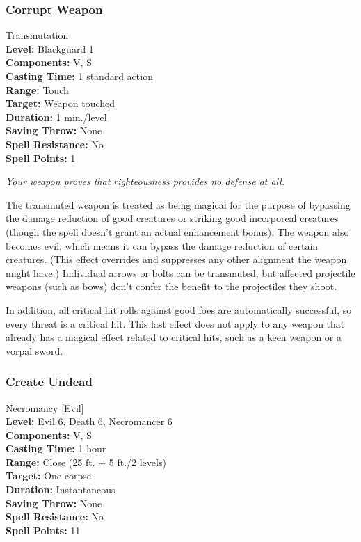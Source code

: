 \subsubsection{Corrupt Weapon}
\label{Spell:CorruptWeapon}
Transmutation
\\ \textbf{Level:} Blackguard 1
\\ \textbf{Components:} V, S
\\ \textbf{Casting Time:} 1 standard action
\\ \textbf{Range:} Touch
\\ \textbf{Target:} Weapon touched
\\ \textbf{Duration:} 1 min./level
\\ \textbf{Saving Throw:} None
\\ \textbf{Spell Resistance:} No
\\ \textbf{Spell Points:} 1

\emph{Your weapon proves that righteousness provides no defense at all.}

The transmuted weapon is treated as being magical for the purpose of bypassing the damage reduction of good creatures or striking good incorporeal creatures (though the spell doesn't grant an actual enhancement bonus). 
The weapon also becomes evil, which means it can bypass the damage reduction of certain creatures. (This effect overrides and suppresses any other alignment the weapon might have.) 
Individual arrows or bolts can be transmuted, but affected projectile weapons (such as bows) don't confer the benefit to the projectiles they shoot.

In addition, all critical hit rolls against good foes are automatically successful, so every threat is a critical hit. 
This last effect does not apply to any weapon that already has a magical effect related to critical hits, such as a keen weapon or a vorpal sword.
\subsubsection{Create Undead}
\label{Spell:CreateUndead}
Necromancy [Evil]
\\ \textbf{Level:} Evil 6, Death 6, Necromancer 6
\\ \textbf{Components:} V, S
\\ \textbf{Casting Time:} 1 hour
\\ \textbf{Range:} Close (25 ft. + 5 ft./2 levels)
\\ \textbf{Target:} One corpse
\\ \textbf{Duration:} Instantaneous
\\ \textbf{Saving Throw:} None
\\ \textbf{Spell Resistance:} No
\\ \textbf{Spell Points:} 11


